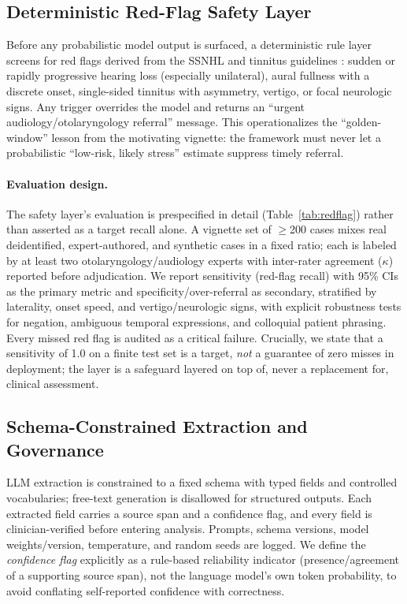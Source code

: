 \subsection{Deterministic Red-Flag Safety Layer}
Before any probabilistic model output is surfaced, a deterministic rule layer screens for red flags derived from the SSNHL and tinnitus guidelines \citep{chandrasekhar2019ssnhl,tunkel2014cpg}: sudden or rapidly progressive hearing loss (especially unilateral), aural fullness with a discrete onset, single-sided tinnitus with asymmetry, vertigo, or focal neurologic signs. Any trigger overrides the model and returns an ``urgent audiology/otolaryngology referral'' message. This operationalizes the ``golden-window'' lesson from the motivating vignette: the framework must never let a probabilistic ``low-risk, likely stress'' estimate suppress timely referral.

\paragraph{Evaluation design.} The safety layer's evaluation is prespecified in detail (Table~\ref{tab:redflag}) rather than asserted as a target recall alone. A vignette set of $\geq$200 cases mixes real deidentified, expert-authored, and synthetic cases in a fixed ratio; each is labeled by at least two otolaryngology/audiology experts with inter-rater agreement ($\kappa$) reported before adjudication. We report sensitivity (red-flag recall) with 95\% CIs as the primary metric and specificity/over-referral as secondary, stratified by laterality, onset speed, and vertigo/neurologic signs, with explicit robustness tests for negation, ambiguous temporal expressions, and colloquial patient phrasing. Every missed red flag is audited as a critical failure. Crucially, we state that a sensitivity of 1.0 on a finite test set is a target, \emph{not} a guarantee of zero misses in deployment; the layer is a safeguard layered on top of, never a replacement for, clinical assessment.

\subsection{Schema-Constrained Extraction and Governance}
LLM extraction is constrained to a fixed schema with typed fields and controlled vocabularies; free-text generation is disallowed for structured outputs. Each extracted field carries a source span and a confidence flag, and every field is clinician-verified before entering analysis. Prompts, schema versions, model weights/version, temperature, and random seeds are logged. We define the \emph{confidence flag} explicitly as a rule-based reliability indicator (presence/agreement of a supporting source span), not the language model's own token probability, to avoid conflating self-reported confidence with correctness.

